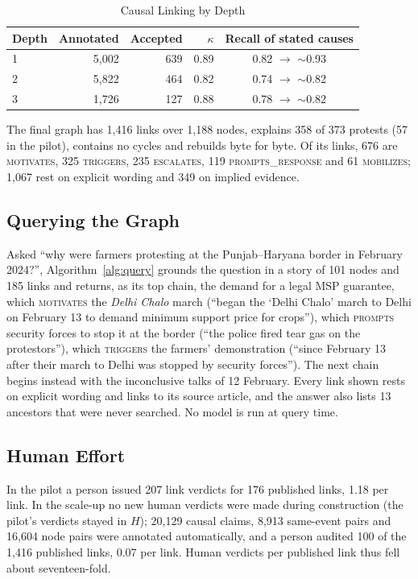 \documentclass[conference]{IEEEtran}
\begin{document}
\begin{table}[t]
\caption{Causal Linking by Depth}
\label{tab:levels}
\centering
\footnotesize
\begin{tabular}{@{}lrrrc@{}}
\toprule
Depth & Annotated & Accepted & $\kappa$ & Recall of stated causes \\
\midrule
1 & 5{,}002 & 639 & 0.89 & 0.82 $\rightarrow$ $\sim$0.93 \\
2 & 5{,}822 & 464 & 0.82 & 0.74 $\rightarrow$ $\sim$0.82 \\
3 & 1{,}726 & 127 & 0.88 & 0.78 $\rightarrow$ $\sim$0.82 \\
\bottomrule
\end{tabular}
\end{table}

The final graph has 1{,}416 links over 1{,}188 nodes, explains 358 of 373 protests (57 in the pilot),
contains no cycles and rebuilds byte for byte. Of its links, 676 are \textsc{motivates}, 325
\textsc{triggers}, 235 \textsc{escalates}, 119 \textsc{prompts\_response} and 61 \textsc{mobilizes};
1{,}067 rest on explicit wording and 349 on implied evidence.

\subsection{Querying the Graph}
Asked ``why were farmers protesting at the Punjab--Haryana border in February 2024?'',
Algorithm~\ref{alg:query} grounds the question in a story of 101 nodes and 185 links and returns,
as its top chain, the demand for a legal MSP guarantee, which \textsc{motivates} the \emph{Delhi
Chalo} march (``began the `Delhi Chalo' march to Delhi on February 13 to demand minimum support price
for crops''), which \textsc{prompts} security forces to stop it at the border (``the police fired
tear gas on the protestors''), which \textsc{triggers} the farmers' demonstration (``since February
13 after their march to Delhi was stopped by security forces''). The next chain begins instead with
the inconclusive talks of 12 February. Every link shown rests on explicit wording and links to its
source article, and the answer also lists 13 ancestors that were never searched. No model is run at
query time.

\subsection{Human Effort}
In the pilot a person issued 207 link verdicts for 176 published links, 1.18 per link. In the
scale-up no new human verdicts were made during construction (the pilot's verdicts stayed in $H$); 20{,}129 causal claims, 8{,}913 same-event pairs and
16{,}604 node pairs were annotated automatically, and a person audited 100 of the 1{,}416 published
links, 0.07 per link. Human verdicts per published link thus fell about seventeen-fold.
\end{document}

